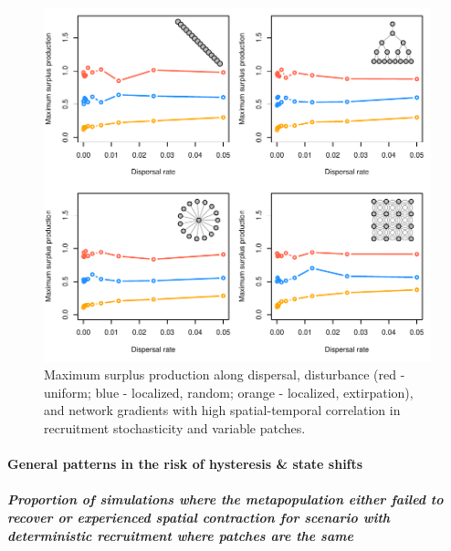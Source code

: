 \documentclass[]{article}
\let\oldparagraph\paragraph
\renewcommand{\paragraph}[1]{\oldparagraph{#1}\mbox{}}
\let\oldsubparagraph\subparagraph
\renewcommand{\subparagraph}[1]{\oldsubparagraph{#1}\mbox{}}
\begin{document}
\begin{figure}[H]

{\centering \includegraphics{Managing_for_ecological_surprises_in_metapopulations_makeHTML_files/figure-latex/MSY with variable patches and space-time stochasticity-1} 

}

\caption{Maximum surplus production along dispersal, disturbance (red - uniform; blue - localized, random; orange - localized, extirpation), and network gradients with high spatial-temporal correlation in recruitment stochasticity and variable patches.}\label{fig:MSY with variable patches and space-time stochasticity}
\end{figure}

\newpage

\hypertarget{general-patterns-in-the-risk-of-hysteresis-state-shifts}{%
\paragraph{General patterns in the risk of hysteresis \& state
shifts}\label{general-patterns-in-the-risk-of-hysteresis-state-shifts}}

\hypertarget{proportion-of-simulations-where-the-metapopulation-either-failed-to-recover-or-experienced-spatial-contraction-for-scenario-with-deterministic-recruitment-where-patches-are-the-same}{%
\subparagraph{Proportion of simulations where the metapopulation either
failed to recover or experienced spatial contraction for scenario with
deterministic recruitment where patches are the
same}\label{proportion-of-simulations-where-the-metapopulation-either-failed-to-recover-or-experienced-spatial-contraction-for-scenario-with-deterministic-recruitment-where-patches-are-the-same}}
\end{document}

